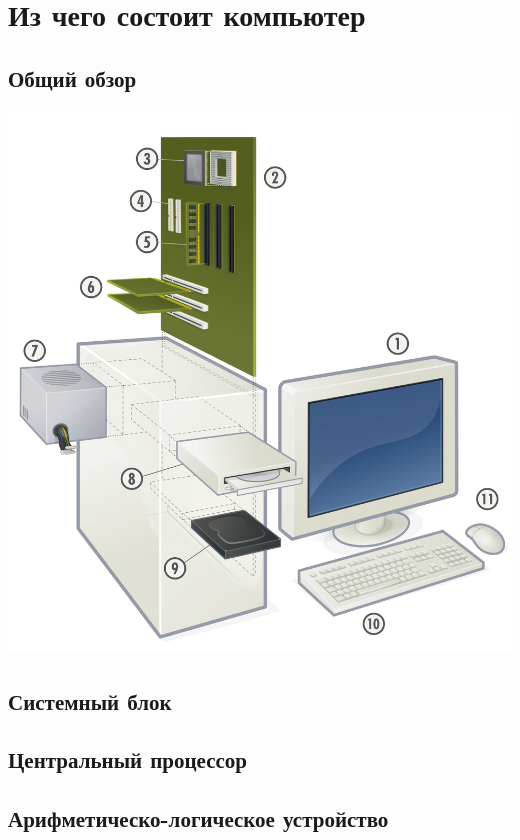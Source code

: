 \section{Из чего состоит компьютер}\label{base:introduction:components}
\subsection{Общий обзор}\label{base:introduction:components:review}
\includegraphics[scale=1]{base/Introduction/Computer.svg}
\subsection{Системный блок}\label{base:introduction:components:case}
\subsection{Центральный процессор}\label{base:introduction:componenents:cpu}
\subsection{Арифметическо-логическое устройство}\label{base:introduction:components:alu}
